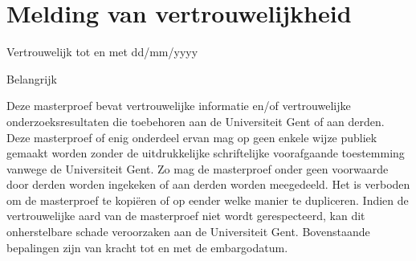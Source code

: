 



\chapter*{Melding van vertrouwelijkheid}

Vertrouwelijk tot en met dd/mm/yyyy

Belangrijk

Deze masterproef bevat vertrouwelijke informatie en/of vertrouwelijke onderzoeksresultaten die toebehoren aan de Universiteit Gent of aan derden. Deze masterproef of enig onderdeel ervan mag op geen enkele wijze publiek gemaakt worden zonder de uitdrukkelijke schriftelijke voorafgaande toestemming vanwege de Universiteit Gent. Zo mag de masterproef onder geen voorwaarde door derden worden ingekeken of aan derden worden meegedeeld. Het is verboden om de masterproef te kopiëren of op eender welke manier te dupliceren. Indien de vertrouwelijke aard van de masterproef niet wordt gerespecteerd, kan dit onherstelbare schade veroorzaken aan de Universiteit Gent. Bovenstaande bepalingen zijn van kracht tot en met de embargodatum.